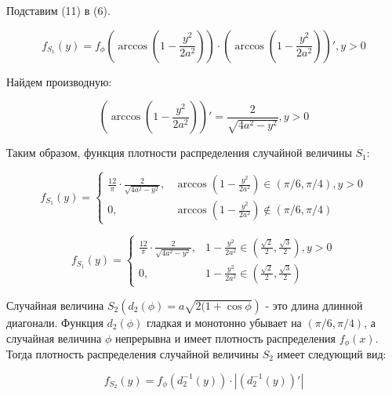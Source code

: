 \documentclass[]{article}
\begin{document}
	Подставим (11) в (6).
	
	\begin{equation}
	f_{S_1}(y) = f_\phi(\arccos(1 - \frac{y^2}{2a^2})) \cdot (\arccos(1 - \frac{y^2}{2a^2}))', y > 0
	\end{equation}
	
	Найдем производную:
	
	\begin{equation}
	(\arccos(1 - \frac{y^2}{2a^2}))' = \frac{2}{\sqrt{4 a ^ 2 - y ^ 2}}, y > 0
	\end{equation}
	
	\vspace{10pt}
	
	Таким образом, функция плотности распределения случайной величины $S_1$:
	
	\begin{equation}
	f_{S_1}(y) = 
	\begin{cases}
	\frac{12}{\pi} \cdot \frac{2}{\sqrt{4 a ^ 2 - y ^ 2}}, & \arccos(1 - \frac{y^2}{2a^2})  \in (\pi/6, \pi/4), y > 0\\
	0, & \arccos(1 - \frac{y^2}{2a^2}) \notin (\pi/6, \pi/4)
	\end{cases}
	\end{equation}
	
	\begin{equation}
	f_{S_1}(y) = 
	\begin{cases}
	\frac{12}{\pi} \cdot \frac{2}{\sqrt{4 a ^ 2 - y ^ 2}}, & 1 - \frac{y^2}{2a^2}  \in (\frac{\sqrt2}{2}, \frac{\sqrt3}{2}), y > 0\\
	0, & 1 - \frac{y^2}{2a^2}  \in (\frac{\sqrt2}{2}, \frac{\sqrt3}{2})
	\end{cases}
	\end{equation}
	
	\vspace{50pt}
	
	Случайная величина $S_2(d_2(\phi) = a\sqrt{2(1+\cos\phi})$ - это длина длинной диагонали. Функция $d_2(\phi)$ гладкая и монотонно убывает на $(\pi/6, \pi/4)$, а случайная величина $\phi$ непрерывна и имеет плотность распределения $f_\phi(x)$. Тогда плотность распределения случайной величины $S_2$ имеет следующий вид:
	
	\vspace{10pt}
	
	\begin{equation}
	f_{S_2}(y) = f_\phi(d_2^{-1}(y)) \cdot |(d_2^{-1}(y))'|
	\end{equation}
	
\end{document}
